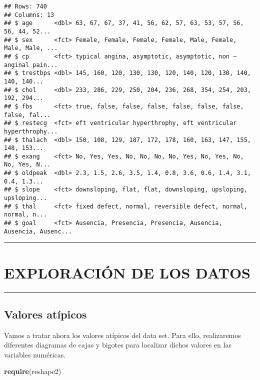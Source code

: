 \documentclass[
]{article}
\newenvironment{Shaded}{\begin{snugshade}}{\end{snugshade}}
\newcommand{\KeywordTok}[1]{\textcolor[rgb]{0.13,0.29,0.53}{\textbf{#1}}}
\newcommand{\NormalTok}[1]{#1}
\begin{document}
\begin{verbatim}
## Rows: 740
## Columns: 13
## $ age      <dbl> 63, 67, 67, 37, 41, 56, 62, 57, 63, 53, 57, 56, 56, 44, 52...
## $ sex      <fct> Female, Female, Female, Female, Male, Female, Male, Male, ...
## $ cp       <fct> typical angina, asymptotic, asymptotic, non — anginal pain...
## $ trestbps <dbl> 145, 160, 120, 130, 130, 120, 140, 120, 130, 140, 140, 140...
## $ chol     <dbl> 233, 286, 229, 250, 204, 236, 268, 354, 254, 203, 192, 294...
## $ fbs      <fct> true, false, false, false, false, false, false, false, fal...
## $ restecg  <fct> eft ventricular hyperthrophy, eft ventricular hyperthrophy...
## $ thalach  <dbl> 150, 108, 129, 187, 172, 178, 160, 163, 147, 155, 148, 153...
## $ exang    <fct> No, Yes, Yes, No, No, No, No, Yes, No, Yes, No, No, Yes, N...
## $ oldpeak  <dbl> 2.3, 1.5, 2.6, 3.5, 1.4, 0.8, 3.6, 0.6, 1.4, 3.1, 0.4, 1.3...
## $ slope    <fct> downsloping, flat, flat, downsloping, upsloping, upsloping...
## $ thal     <fct> fixed defect, normal, reversible defect, normal, normal, n...
## $ goal     <fct> Ausencia, Presencia, Presencia, Ausencia, Ausencia, Ausenc...
\end{verbatim}

\begin{center}\rule{0.5\linewidth}{0.5pt}\end{center}

\hypertarget{exploraciuxf3n-de-los-datos}{%
\section{EXPLORACIÓN DE LOS DATOS}\label{exploraciuxf3n-de-los-datos}}

\begin{center}\rule{0.5\linewidth}{0.5pt}\end{center}

\hypertarget{valores-atuxedpicos}{%
\subsection{Valores atípicos}\label{valores-atuxedpicos}}

Vamos a tratar ahora los valores atípicos del data set. Para ello,
realizaremos diferentes diagramas de cajas y bigotes para localizar
dichos valores en las variables numéricas.

\begin{Shaded}
\begin{Highlighting}[]
\KeywordTok{require}\NormalTok{(reshape2)}
\end{Highlighting}
\end{Shaded}
\end{document}
